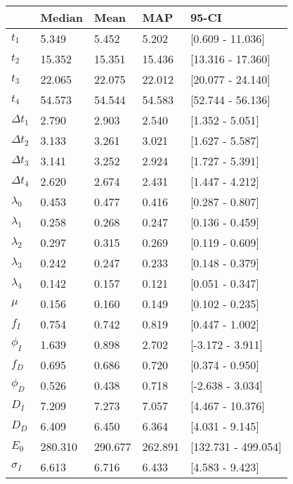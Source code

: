 \begin{tabular}{lllll}
\toprule
{} &   Median &     Mean &      MAP &                95-CI \\
\midrule
$t_1$        &    5.349 &    5.452 &    5.202 &     [0.609 - 11.036] \\
$t_2$        &   15.352 &   15.351 &   15.436 &    [13.316 - 17.360] \\
$t_3$        &   22.065 &   22.075 &   22.012 &    [20.077 - 24.140] \\
$t_4$        &   54.573 &   54.544 &   54.583 &    [52.744 - 56.136] \\
$\Delta t_1$ &    2.790 &    2.903 &    2.540 &      [1.352 - 5.051] \\
$\Delta t_2$ &    3.133 &    3.261 &    3.021 &      [1.627 - 5.587] \\
$\Delta t_3$ &    3.141 &    3.252 &    2.924 &      [1.727 - 5.391] \\
$\Delta t_4$ &    2.620 &    2.674 &    2.431 &      [1.447 - 4.212] \\
$\lambda_0$  &    0.453 &    0.477 &    0.416 &      [0.287 - 0.807] \\
$\lambda_1$  &    0.258 &    0.268 &    0.247 &      [0.136 - 0.459] \\
$\lambda_2$  &    0.297 &    0.315 &    0.269 &      [0.119 - 0.609] \\
$\lambda_3$  &    0.242 &    0.247 &    0.233 &      [0.148 - 0.379] \\
$\lambda_4$  &    0.142 &    0.157 &    0.121 &      [0.051 - 0.347] \\
$\mu$        &    0.156 &    0.160 &    0.149 &      [0.102 - 0.235] \\
$f_I$        &    0.754 &    0.742 &    0.819 &      [0.447 - 1.002] \\
$\phi_I$     &    1.639 &    0.898 &    2.702 &     [-3.172 - 3.911] \\
$f_D$        &    0.695 &    0.686 &    0.720 &      [0.374 - 0.950] \\
$\phi_D$     &    0.526 &    0.438 &    0.718 &     [-2.638 - 3.034] \\
$D_I$        &    7.209 &    7.273 &    7.057 &     [4.467 - 10.376] \\
$D_D$        &    6.409 &    6.450 &    6.364 &      [4.031 - 9.145] \\
$E_0$        &  280.310 &  290.677 &  262.891 &  [132.731 - 499.054] \\
$\sigma_I$   &    6.613 &    6.716 &    6.433 &      [4.583 - 9.423] \\

\end{tabular}
